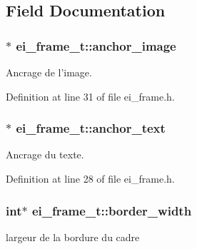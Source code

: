 \subsection{Field Documentation}
\hypertarget{structei__frame__t_a94e97ecc8308b6be2a610683d654fd62}{
\subsubsection[{anchor\-\_\-image}]{$\ast$ ei\-\_\-frame\-\_\-t\-::anchor\-\_\-image}}\label{structei__frame__t_a94e97ecc8308b6be2a610683d654fd62}


Ancrage de l'image. 



Definition at line 31 of file ei\-\_\-frame.\-h.

\hypertarget{structei__frame__t_a5ad39014014507f967ba5a38ef57fcbb}{
\subsubsection[{anchor\-\_\-text}]{$\ast$ ei\-\_\-frame\-\_\-t\-::anchor\-\_\-text}}\label{structei__frame__t_a5ad39014014507f967ba5a38ef57fcbb}


Ancrage du texte. 



Definition at line 28 of file ei\-\_\-frame.\-h.

\hypertarget{structei__frame__t_af9014a63bb45010387c762ac93bc0052}{
\subsubsection[{border\-\_\-width}]{\setlength{\rightskip}{0pt plus 5cm}int$\ast$ ei\-\_\-frame\-\_\-t\-::border\-\_\-width}}\label{structei__frame__t_af9014a63bb45010387c762ac93bc0052}


largeur de la bordure du cadre 




